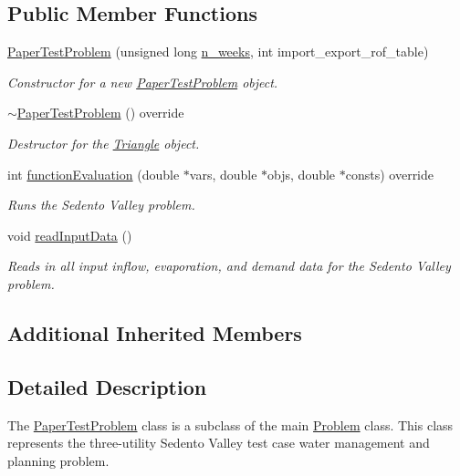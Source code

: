 \subsection*{Public Member Functions}
\begin{DoxyCompactItemize}
\item 
\mbox{\hyperlink{classPaperTestProblem_acc053a5b4515f3959494ce58c763d582}{Paper\+Test\+Problem}} (unsigned long \mbox{\hyperlink{classProblem_ac7513bb0ecdfa4bbb7d2ada3595d71ec}{n\+\_\+weeks}}, int import\+\_\+export\+\_\+rof\+\_\+table)
\begin{DoxyCompactList}\small\item\em Constructor for a new \mbox{\hyperlink{classPaperTestProblem}{Paper\+Test\+Problem}} object. \end{DoxyCompactList}\item 
\mbox{\hyperlink{classPaperTestProblem_a571a92266d4c58ebc27e20391f7ad81b}{$\sim$\+Paper\+Test\+Problem}} () override
\begin{DoxyCompactList}\small\item\em Destructor for the \mbox{\hyperlink{classTriangle}{Triangle}} object. \end{DoxyCompactList}\item 
int \mbox{\hyperlink{classPaperTestProblem_a6db78df74d40f69a750b164caaca75c7}{function\+Evaluation}} (double $\ast$vars, double $\ast$objs, double $\ast$consts) override
\begin{DoxyCompactList}\small\item\em Runs the Sedento Valley problem. \end{DoxyCompactList}\item 
void \mbox{\hyperlink{classPaperTestProblem_ae4bcc17d6ceab628f88174306d54fdc9}{read\+Input\+Data}} ()
\begin{DoxyCompactList}\small\item\em Reads in all input inflow, evaporation, and demand data for the Sedento Valley problem. \end{DoxyCompactList}\end{DoxyCompactItemize}
\subsection*{Additional Inherited Members}


\subsection{Detailed Description}
The {\ttfamily \mbox{\hyperlink{classPaperTestProblem}{Paper\+Test\+Problem}}} class is a subclass of the main {\ttfamily \mbox{\hyperlink{classProblem}{Problem}}} class. This class represents the three-\/utility Sedento Valley test case water management and planning problem. 

